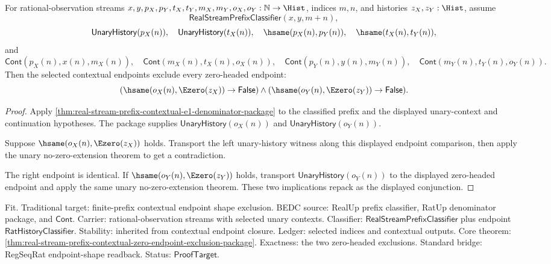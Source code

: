 \begin{theorem}
\label{thm:real-stream-prefix-contextual-zero-endpoint-exclusion-package}
For rational-observation streams
$x,y,p_X,p_Y,t_X,t_Y,m_X,m_Y,o_X,o_Y:\mathbb{N}\to\Hist$, indices $m,n$,
and histories $z_X,z_Y:\Hist$, assume
$$
\mathsf{RealStreamPrefixClassifier}(x,y,m+n),
$$
$$
\mathsf{UnaryHistory}(p_X(n)),\quad
\mathsf{UnaryHistory}(t_X(n)),\quad
\hsame(p_X(n),p_Y(n)),\quad
\hsame(t_X(n),t_Y(n)),
$$
and
$$
\mathsf{Cont}(p_X(n),x(n),m_X(n)),\quad
\mathsf{Cont}(m_X(n),t_X(n),o_X(n)),
\quad
\mathsf{Cont}(p_Y(n),y(n),m_Y(n)),\quad
\mathsf{Cont}(m_Y(n),t_Y(n),o_Y(n)).
$$
Then the selected contextual endpoints exclude every zero-headed endpoint:
$$
(\hsame(o_X(n),\Ezero(z_X))\to\mathsf{False})\land
(\hsame(o_Y(n),\Ezero(z_Y))\to\mathsf{False}).
$$
\end{theorem}
\begin{proof}
Apply
\autoref{thm:real-stream-prefix-contextual-e1-denominator-package} to the
classified prefix and the displayed unary-context and continuation hypotheses.
The package supplies $\mathsf{UnaryHistory}(o_X(n))$ and
$\mathsf{UnaryHistory}(o_Y(n))$.

Suppose $\hsame(o_X(n),\Ezero(z_X))$ holds. Transport the left unary-history
witness along this displayed endpoint comparison, then apply the unary
no-zero-extension theorem to get a contradiction.

The right endpoint is identical. If $\hsame(o_Y(n),\Ezero(z_Y))$ holds,
transport $\mathsf{UnaryHistory}(o_Y(n))$ to the displayed zero-headed endpoint
and apply the same unary no-zero-extension theorem. These two implications
repack as the displayed conjunction.
\end{proof}

Fit. Traditional target: finite-prefix contextual endpoint shape exclusion.
BEDC source: RealUp prefix classifier, RatUp denominator package, and
$\mathsf{Cont}$. Carrier: rational-observation streams with selected unary
contexts. Classifier: $\mathsf{RealStreamPrefixClassifier}$ plus endpoint
$\mathsf{RatHistoryClassifier}$. Stability: inherited from contextual endpoint
closure. Ledger: selected indices and contextual outputs. Core theorem:
\autoref{thm:real-stream-prefix-contextual-zero-endpoint-exclusion-package}.
Exactness: the two zero-headed exclusions. Standard bridge: RegSeqRat
endpoint-shape readback. Status: $\mathsf{ProofTarget}$.


